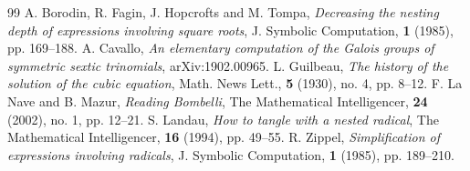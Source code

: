 \documentclass[11pt,a4paper]{article}
\numberwithin{equation}{section}
\theoremstyle{definition}
\begin{document}
\begin{thebibliography}{99}
 A. Borodin, R. Fagin, J. Hopcrofts and M. Tompa, \emph{Decreasing the nesting depth of expressions involving square roots},
 J. Symbolic Computation, \textbf 1 (1985), pp. 169--188.
  A. Cavallo, \emph{An elementary computation of the Galois groups of symmetric
 sextic trinomials}, arXiv:1902.00965.  
  L. Guilbeau, \emph{The history of the solution of the cubic equation},
  Math. News Lett., \textbf 5 (1930), no. 4, pp. 8--12.
  F. La Nave and B. Mazur, \emph{Reading Bombelli},
  The Mathematical Intelligencer, \textbf{24} (2002), no. 1, pp. 12--21.
  S. Landau, \emph{How to tangle with a nested radical},
  The Mathematical Intelligencer, \textbf{16} (1994), pp. 49--55.
  R. Zippel, \emph{Simplification of expressions involving radicals},
  J. Symbolic Computation, \textbf 1 (1985), pp. 189--210.
\end{thebibliography}
\end{document}
